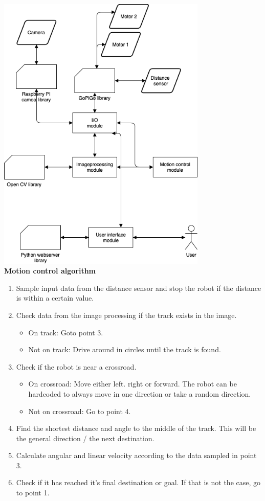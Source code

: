 \documentclass[11pt]{article}
\begin{document}
\includegraphics[width=10cm]{flowdiagram}
\\
\textbf{Motion control algorithm}
\\
\begin{enumerate}
    \item Sample input data from the distance sensor and stop the robot if the distance is within a certain value. 
    \item Check data from the image processing if the track exists in the image. \begin{itemize}
        \item On track: Goto point 3. 
        \item Not on track: Drive around in circles until the track is found.
    \end{itemize}
    \item Check if the robot is near a crossroad. \begin{itemize}
        \item On crossroad: Move either left. right or forward. The robot can be hardcoded to always move in one direction or take a random direction. 
        \item Not on crossroad: Go to point 4. 
    \end{itemize}
    \item Find the shortest distance and angle to the middle of the track. This will be the general direction / the next destination. 
    \item Calculate angular and linear velocity according to the data sampled in point 3. 
    \item Check if it has reached it's final destination or goal. If that is not the case, go to point 1.
\end{enumerate}
\end{document}
